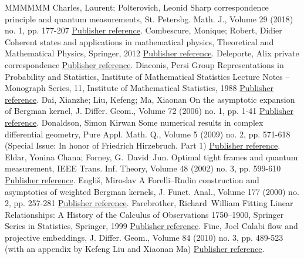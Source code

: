 \documentclass[11pt]{article}
\theoremstyle{definition}
\numberwithin{equation}{section}
\numberwithin{figure}{section}
\numberwithin{table}{section}
\newcommand\< {\mathcal{h}}
\renewcommand\> {\mathcal{i}}
\begin{document}
\begin{thebibliography}{MMMMMM}
 Charles, Laurent; Polterovich, Leonid Sharp correspondence principle and quantum measurements, St. Petersbg. Math. J., Volume 29 (2018) no. 1, pp. 177-207 \href{https://ahl.centre-mersenne.org/item/AHL_2020__3__1343_0/#CP}{Publisher reference}.
 Combescure, Monique; Robert, Didier Coherent states and applications in mathematical physics, Theoretical and Mathematical Physics, Springer, 2012 \href{https://ahl.centre-mersenne.org/item/AHL_2020__3__1343_0/#CR}{Publisher reference}.
 Deleporte, Alix private correspondence \href{https://ahl.centre-mersenne.org/item/AHL_2020__3__1343_0/#Deleporte}{Publisher reference}.
 Diaconis, Persi Group Representations in Probability and Statistics, Institute of Mathematical Statistics Lecture Notes – Monograph Series, 11, Institute of Mathematical Statistics, 1988 \href{https://ahl.centre-mersenne.org/item/AHL_2020__3__1343_0/#Diaconis}{Publisher reference}.
 Dai, Xianzhe; Liu, Kefeng; Ma, Xiaonan On the asymptotic expansion of Bergman kernel, J. Differ. Geom., Volume 72 (2006) no. 1, pp. 1-41 \href{https://ahl.centre-mersenne.org/item/AHL_2020__3__1343_0/#DLM06}{Publisher reference}.
 Donaldson, Simon Kirwan Some numerical results in complex differential geometry, Pure Appl. Math. Q., Volume 5 (2009) no. 2, pp. 571-618 (Special Issue: In honor of Friedrich Hirzebruch. Part 1) \href{https://ahl.centre-mersenne.org/item/AHL_2020__3__1343_0/#D}{Publisher reference}.
 Eldar, Yonina Chana; Forney, G. David Jun. Optimal tight frames and quantum measurement, IEEE Trans. Inf. Theory, Volume 48 (2002) no. 3, pp. 599-610 \href{https://ahl.centre-mersenne.org/item/AHL_2020__3__1343_0/#EF}{Publisher reference}.
 Engliš, Miroslav A Forelli–Rudin construction and asymptotics of weighted Bergman kernels, J. Funct. Anal., Volume 177 (2000) no. 2, pp. 257-281 \href{https://ahl.centre-mersenne.org/item/AHL_2020__3__1343_0/#E00}{Publisher reference}.
 Farebrother, Richard William Fitting Linear Relationships: A History of the Calculus of Observations 1750–1900, Springer Series in Statistics, Springer, 1999 \href{https://ahl.centre-mersenne.org/item/AHL_2020__3__1343_0/#Fare}{Publisher reference}.
 Fine, Joel Calabi flow and projective embeddings, J. Differ. Geom., Volume 84 (2010) no. 3, pp. 489-523 (with an appendix by Kefeng Liu and Xiaonan Ma) \href{https://ahl.centre-mersenne.org/item/AHL_2020__3__1343_0/#Fin10}{Publisher reference}.

\end{thebibliography}
\end{document}
